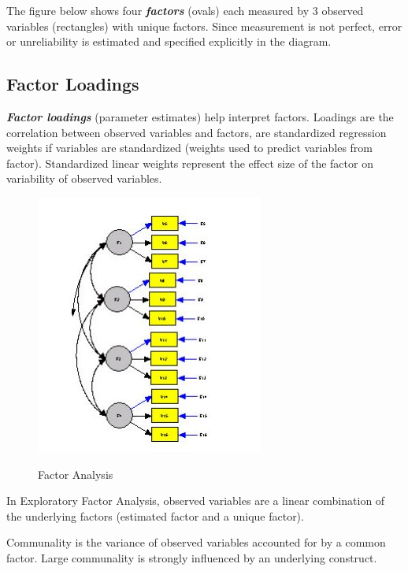 The figure below shows four \textbf{\emph{factors}} (ovals) each measured by 3 observed variables (rectangles) with unique factors. Since measurement is not perfect, error or unreliability is estimated and specified explicitly in the diagram.

\subsection*{Factor Loadings}
\textbf{\emph{Factor loadings}} (parameter estimates) help interpret factors. Loadings are the correlation between observed variables and factors, are standardized regression weights if variables are standardized (weights used to predict variables from factor). Standardized linear weights represent the effect size of the factor
on variability of observed variables.

\begin{figure}[h!]
\begin{center}
  \includegraphics[scale=0.6]{4AFactor.jpg}\\
  \caption{Factor Analysis}
\end{center}
\end{figure}

In Exploratory Factor Analysis, observed variables are a linear combination of the underlying factors (estimated factor and a unique factor).

Communality is the variance of observed variables accounted for by a common factor. Large communality is strongly
influenced by an underlying construct.

